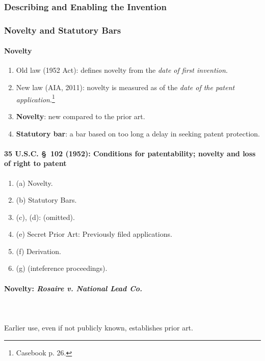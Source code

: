 
\subsubsection{Describing and Enabling the Invention}




\subsubsection{Novelty and Statutory Bars}

\paragraph{Novelty}

\begin{enumerate}
    \item Old law (1952 Act): defines novelty from the \emph{date of first 
    invention}.
    \item New law (AIA, 2011): novelty is measured as of the \emph{date of the 
    patent application}.\footnote{Casebook p. 26.}
    \item \textbf{Novelty}: new compared to the prior art.
    \item \textbf{Statutory bar}: a bar based on too long a delay in seeking 
    patent protection.
\end{enumerate}

\paragraph{35 U.S.C. \S\ 102 (1952): Conditions for patentability; novelty and 
loss of right to patent}

\begin{enumerate}
    \item (a) Novelty.
    \item (b) Statutory Bars.
    \item (c), (d): (omitted).
    \item (e) Secret Prior Art: Previously filed applications.
    \item (f) Derivation.
    \item (g) (inteference proceedings).
\end{enumerate}

\paragraph{Novelty: \emph{Rosaire v. National Lead Co.}}
~\\\\
Earlier use, even if not publicly known, establishes prior art.

